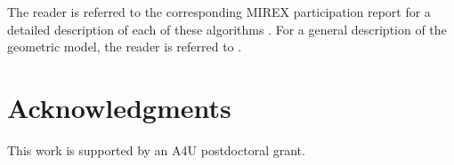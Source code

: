 \documentclass[twoside]{article}
\begin{document}
The reader is referred to the corresponding MIREX participation report for a detailed description of each of these algorithms \cite{Urbano2010:mirex2010,Urbano2011:mirex2011,Urbano2012:mirex2012,Urbano2013:mirex2013}. For a general description of the geometric model, the reader is referred to \cite{Urbano2011:shape}.

\section*{Acknowledgments}
This work is supported by an A4U postdoctoral grant.



\end{document}
